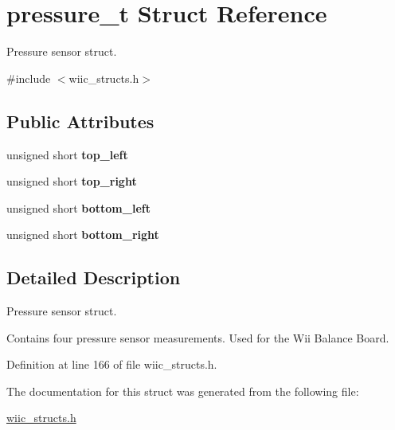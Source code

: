 \hypertarget{structpressure__t}{\section{pressure\-\_\-t \-Struct \-Reference}
\label{structpressure__t}
}


\-Pressure sensor struct.  




{\ttfamily \#include $<$wiic\-\_\-structs.\-h$>$}

\subsection*{\-Public \-Attributes}
\begin{DoxyCompactItemize}
\item 
\hypertarget{structpressure__t_a167d7a09cc4ad83bd7a09742602fe921}{unsigned short {\bfseries top\-\_\-left}}\label{structpressure__t_a167d7a09cc4ad83bd7a09742602fe921}

\item 
\hypertarget{structpressure__t_a3fa9151be69fe16f0c2b8c920b024b31}{unsigned short {\bfseries top\-\_\-right}}\label{structpressure__t_a3fa9151be69fe16f0c2b8c920b024b31}

\item 
\hypertarget{structpressure__t_a155000ccfe2f110fec14172b065d60e5}{unsigned short {\bfseries bottom\-\_\-left}}\label{structpressure__t_a155000ccfe2f110fec14172b065d60e5}

\item 
\hypertarget{structpressure__t_af2e7e0b2f6433ca8f82fa5ad15b8b1ba}{unsigned short {\bfseries bottom\-\_\-right}}\label{structpressure__t_af2e7e0b2f6433ca8f82fa5ad15b8b1ba}

\end{DoxyCompactItemize}


\subsection{\-Detailed \-Description}
\-Pressure sensor struct. 

\-Contains four pressure sensor measurements. \-Used for the \-Wii \-Balance \-Board. 

\-Definition at line 166 of file wiic\-\_\-structs.\-h.



\-The documentation for this struct was generated from the following file\-:\begin{DoxyCompactItemize}
\item 
\hyperlink{wiic__structs_8h}{wiic\-\_\-structs.\-h}\end{DoxyCompactItemize}
